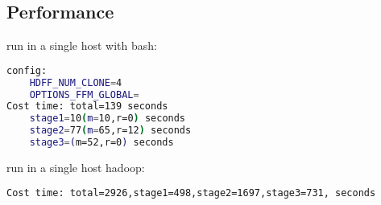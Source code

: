 \subsection{Performance}


run in a single host with bash:

\begin{lstlisting}[language=bash]
config:
    HDFF_NUM_CLONE=4
    OPTIONS_FFM_GLOBAL=
Cost time: total=139 seconds
    stage1=10(m=10,r=0) seconds
    stage2=77(m=65,r=12) seconds
    stage3=(m=52,r=0) seconds
\end{lstlisting}


run in a single host hadoop:
\begin{lstlisting}[language=bash]
Cost time: total=2926,stage1=498,stage2=1697,stage3=731, seconds
\end{lstlisting}



